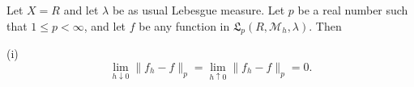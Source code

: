 Let $X = R$ and let $\lambda$ be as usual Lebesgue measure. Let $p$ be a real number such that $1 \leq p < \infty$, and let $f$ be any function in $\mathfrak{L}_p(R, \mathcal{M}_h, \lambda)$. Then

(i) $$\lim_{h \downarrow 0} \|f_h - f\|_p = \lim_{h \uparrow 0} \|f_h - f\|_p = 0.$$